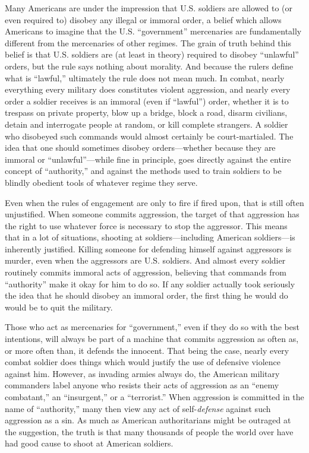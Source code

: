 \documentclass{book}
\begin{document}
Many Americans are under the impression that U.S. soldiers are allowed to (or even required to) disobey any illegal or immoral order, a belief which allows Americans to imagine that the U.S. \enquote{government} mercenaries are fundamentally different from the mercenaries of other regimes. The grain of truth behind this belief is that U.S. soldiers are (at least in theory) required to disobey \enquote{unlawful} orders, but the rule says nothing about morality. And because the rulers define what is \enquote{lawful,} ultimately the rule does not mean much. In combat, nearly everything every military does constitutes violent aggression, and nearly every order a soldier receives is an immoral (even if \enquote{lawful}) order, whether it is to trespass on private property, blow up a bridge, block a road, disarm civilians, detain and interrogate people at random, or kill complete strangers. A soldier who disobeyed such commands would almost certainly be court-martialed. The idea that one should sometimes disobey orders---whether because they are immoral or \enquote{unlawful}---while fine in principle, goes directly against the entire concept of \enquote{authority,} and against the methods used to train soldiers to be blindly obedient tools of whatever regime they serve.

Even when the rules of engagement are only to fire if fired upon, that is still often unjustified. When someone commits aggression, the target of that aggression has the right to use whatever force is necessary to stop the aggressor. This means that in a lot of situations, shooting at soldiers---including American soldiers---is inherently justified. Killing someone for defending himself against aggressors is murder, even when the aggressors are U.S. soldiers. And almost every soldier routinely commits immoral acts of aggression, believing that commands from \enquote{authority} make it okay for him to do so. If any soldier actually took seriously the idea that he should disobey an immoral order, the first thing he would do would be to quit the military.

Those who act as mercenaries for \enquote{government,} even if they do so with the best intentions, will always be part of a machine that commits aggression as often as, or more often than, it defends the innocent. That being the case, nearly every combat soldier does things which would justify the use of defensive violence against him. However, as invading armies always do, the American military commanders label anyone who resists their acts of aggression as an \enquote{enemy combatant,} an \enquote{insurgent,} or a \enquote{terrorist.} When aggression is committed in the name of \enquote{authority,} many then view any act of self-\emph{defense} against such aggression as a sin. As much as American authoritarians might be outraged at the suggestion, the truth is that many thousands of people the world over have had good cause to shoot at American soldiers.
\end{document}
